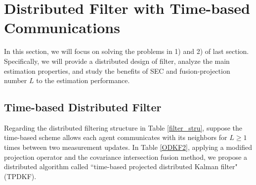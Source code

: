 \documentclass[journal,transmag]{IEEEtran}
\begin{document}
	\section{Distributed Filter with Time-based Communications}
	In this section, we will focus on solving the problems in 1) and 2) of last section. Specifically, we will provide a distributed design of filter, analyze the main estimation properties, and study the benefits of SEC and fusion-projection number $L$ to the estimation performance.
	\subsection{Time-based Distributed Filter}
	Regarding the distributed filtering structure in Table \ref{filter_stru}, 
	suppose the time-based  scheme allows each agent communicates with its neighbors for $L\geq 1$ times  between two measurement updates. In Table \ref{ODKF2}, 
	applying a modified projection operator and the covariance intersection fusion  method, 	
	we propose a distributed algorithm called ``time-based projected distributed Kalman filter" (TPDKF). 
\end{document}
